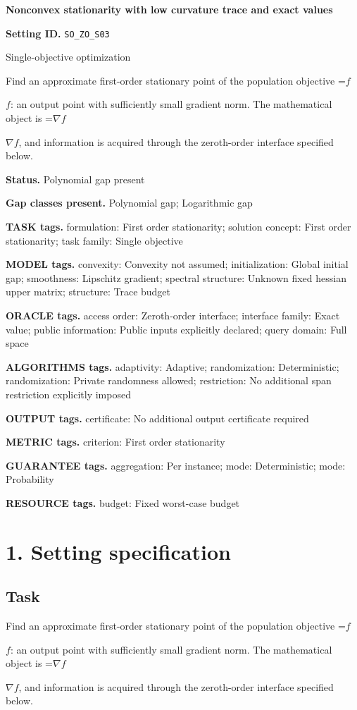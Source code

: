 \documentclass[10pt,a4paper]{article}
\newcommand{\AtlasMath}[1]{\par\begingroup\centering\setbox0=\hbox{$\displaystyle #1$}\ifdim\wd0>1.4\linewidth\typeout{ATLAS WIDE FORMULA: \the\wd0}\fi\ifdim\wd0>\linewidth\resizebox{\linewidth}{!}{\box0}\else\box0\fi\par\endgroup}
\newcommand{\AtlasInlineMath}[1]{\begingroup\setbox0=\hbox{$#1$}\ifdim\wd0>.4\linewidth\endgroup\AtlasMath{#1}\else\endgroup$#1$\fi}
\begin{document}
\raggedright

{\LARGE\bfseries\sffamily\color{AtlasNavy} Nonconvex stationarity with low curvature trace and exact values\par}\vspace{5pt}
\textbf{Setting ID.} \texttt{SO\_\allowbreak{}ZO\_\allowbreak{}S03}

Single-objective optimization

Find an approximate first-order stationary point of the population objective \AtlasInlineMath{f}: an output point with sufficiently small gradient norm. The mathematical object is \AtlasInlineMath{\nabla f}, and information is acquired through the zeroth-order interface specified below.

\textbf{Status.} Polynomial gap present

\textbf{Gap classes present.} Polynomial gap; Logarithmic gap

\textbf{TASK tags.} formulation: First order stationarity; solution concept: First order stationarity; task family: Single objective

\textbf{MODEL tags.} convexity: Convexity not assumed; initialization: Global initial gap; smoothness: Lipschitz gradient; spectral structure: Unknown fixed hessian upper matrix; structure: Trace budget

\textbf{ORACLE tags.} access order: Zeroth-order interface; interface family: Exact value; public information: Public inputs explicitly declared; query domain: Full space

\textbf{ALGORITHMS tags.} adaptivity: Adaptive; randomization: Deterministic; randomization: Private randomness allowed; restriction: No additional span restriction explicitly imposed

\textbf{OUTPUT tags.} certificate: No additional output certificate required

\textbf{METRIC tags.} criterion: First order stationarity

\textbf{GUARANTEE tags.} aggregation: Per instance; mode: Deterministic; mode: Probability

\textbf{RESOURCE tags.} budget: Fixed worst-case budget

\section{1. Setting specification}
\subsection{Task}
Find an approximate first-order stationary point of the population objective \AtlasInlineMath{f}: an output point with sufficiently small gradient norm. The mathematical object is \AtlasInlineMath{\nabla f}, and information is acquired through the zeroth-order interface specified below.
\end{document}
